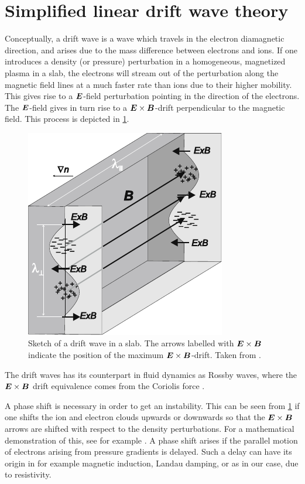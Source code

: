 \section{Simplified linear drift wave theory}
\label{sec:simpleLin}
%
Conceptually, a drift wave is a wave which travels in the electron diamagnetic direction, and arises due to the mass difference between electrons and ions.
If one introduces a density (or pressure) perturbation in a homogeneous, magnetized plasma in a slab, the  electrons will stream out of the perturbation along the magnetic field lines at a much faster rate than ions due to their higher mobility.
This gives rise to a $\boldsymbol{E}$-field perturbation pointing in the direction of the electrons.
The $\boldsymbol{E}$-field gives in turn rise to a $\boldsymbol{E}\times\boldsymbol{B}$-drift perpendicular to the magnetic field.
This process is depicted in \cref{fig:DW}.
%
\begin{figure}[htb]
    \centering
    \includegraphics{fig/driftwave}
    \caption{
        Sketch of a drift wave in a slab.
        The arrows labelled with $\boldsymbol{E}\times\boldsymbol{B}$ indicate the position of the maximum $\boldsymbol{E}\times\boldsymbol{B}$-drift.
        Taken from \cite{Stroth2011book}.
    }
    \label{fig:DW}
\end{figure}
%
The drift waves has its counterpart in fluid dynamics as Rossby waves, where the $\boldsymbol{E}\times\boldsymbol{B}$ drift equivalence comes from the Coriolis force \cite{Shepherd1987}.

A phase shift is necessary in order to get an instability.
This can be seen from \cref{fig:DW} if one shifts the ion and electron clouds upwards or downwards so that the $\boldsymbol{E}\times\boldsymbol{B}$ arrows are shifted with respect to the density perturbations.
For a mathematical demonstration of this, see for example \cite{Garcia2001a}.
A phase shift arises if the parallel motion of electrons arising from pressure gradients is delayed.
Such a delay can have its origin in for example magnetic induction, Landau damping, or as in our case, due to resistivity.

